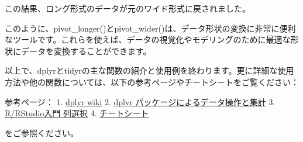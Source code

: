 \documentclass[
]{article}
\begin{document}
この結果、ロング形式のデータが元のワイド形式に戻されました。

このように、pivot\_longer()とpivot\_wider()は、データ形状の変換に非常に便利なツールです。これらを使えば、データの視覚化やモデリングのために最適な形状にデータを変換することができます。

以上で、dplyrとtidyrの主な関数の紹介と使用例を終わります。更に詳細な使用方法や他の関数については、以下の参考ページやチートシートをご覧ください：

参考ページ： 1.
\href{http://sugiura-ken.org/wiki/wiki.cgi/exp?page=dplyr}{dplyr wiki}
2. \href{https://stats.biopapyrus.jp/r/tidyverse/dplyr.html}{dplyr
パッケージによるデータ操作と集計} 3.
\href{https://kazutan.github.io/JSSP2018_spring/data_handling.html\#列選択}{R/RStudio入門
列選択} 4.
\href{https://raw.githubusercontent.com/rstudio/cheatsheets/main/translations/japanese/data-wrangling_ja.pdf}{チートシート}

をご参照ください。
\end{document}
